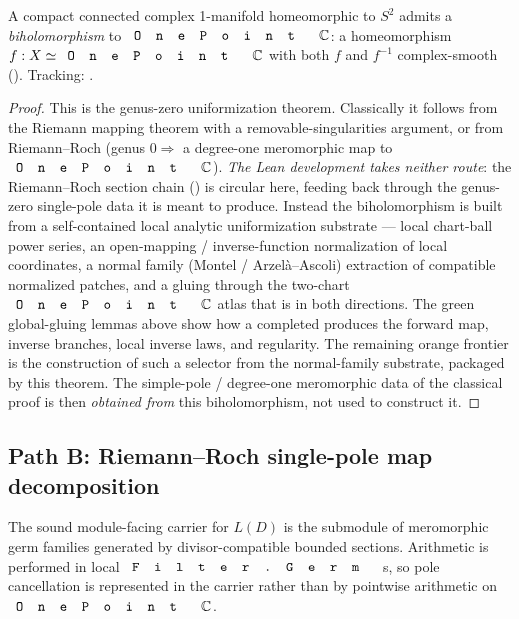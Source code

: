 \begin{theorem}
\label{thm:uniformization-genus-zero-biholomorphism}
A compact connected complex 1-manifold homeomorphic to \(S^2\) admits a
\emph{biholomorphism} to \(\code{OnePoint}\,\C\): a homeomorphism
\(f:X\simeq\code{OnePoint}\,\C\) with both \(f\) and \(f^{-1}\) complex-smooth
().
Tracking: .
\notready
\end{theorem}
\begin{proof}
This is the genus-zero uniformization theorem. Classically it follows from the
Riemann mapping theorem with a removable-singularities argument, or from
Riemann--Roch (genus \(0\Rightarrow\) a degree-one meromorphic map to
\(\code{OnePoint}\,\C\)). \emph{The Lean development takes neither route}: the
Riemann--Roch section chain () is circular
here, feeding back through the genus-zero single-pole data it is meant to
produce. Instead the biholomorphism is built from a self-contained local
analytic uniformization substrate --- local chart-ball power series, an
open-mapping / inverse-function normalization of local coordinates, a normal
family (Montel / Arzel\`a--Ascoli) extraction of compatible normalized patches,
and a gluing through the two-chart \(\code{OnePoint}\,\C\) atlas that is
 in both directions. The green global-gluing lemmas above show
how a completed  produces the
forward map, inverse branches, local inverse laws, and 
regularity. The remaining orange frontier is the construction of such a
selector from the normal-family substrate, packaged by this theorem. The
simple-pole / degree-one meromorphic data of the classical proof is then
\emph{obtained from} this biholomorphism, not used to construct it.
\end{proof}

\subsection{Path B: Riemann--Roch single-pole map decomposition}
\label{sec:path-b-rr-single-pole-map}

\begin{definition}
\label{def:rr-germ-space-carrier}
The sound module-facing carrier for \(L(D)\) is the submodule of meromorphic
germ families generated by divisor-compatible bounded sections. Arithmetic is
performed in local \(\code{Filter.Germ}\)s, so pole cancellation is represented
in the carrier rather than by pointwise arithmetic on \(\code{OnePoint}\,\C\).
\leanok
\end{definition}

